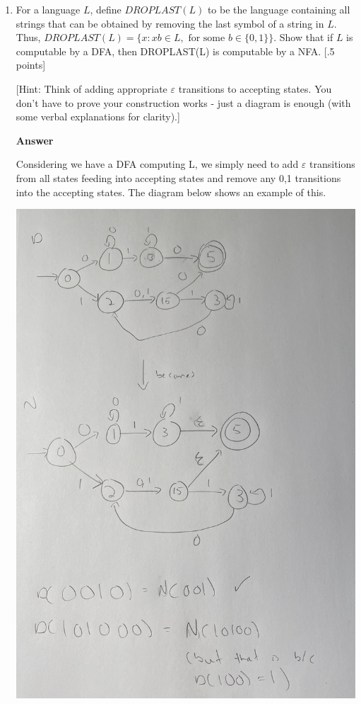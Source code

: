 \documentclass[11pt]{article}
\newcommand \kw[1]{\textbf{#1}}
\newenvironment{answer}{
\vspace{.5cm}
\kw{Answer} 

}
{
\pagebreak
}
\begin{document}
\begin{enumerate}
\item For a language $L$, define $DROPLAST(L)$ to be the language containing all strings that can be obtained by removing the last symbol of a string in $L$. Thus, $DROPLAST(L) = \{x: xb \in L, \text{ for some }b \in \{0,1\}\}$. Show that if $L$ is computable by a DFA, then DROPLAST(L) is computable by a NFA. [.5 points]

[Hint: Think of adding appropriate $\varepsilon$ transitions to accepting states. You don't have to prove your construction works - just a diagram is enough (with some verbal explanations for clarity).]

\begin{answer}
    Considering we have a DFA computing L, we simply need to add $\varepsilon$ transitions from all states feeding into accepting states and remove any 0,1 transitions into the accepting states. The diagram below shows an example of this.

    \includegraphics[scale=.125]{nfa-5.jpg}
\end{answer}

\end{enumerate}
\end{document}
